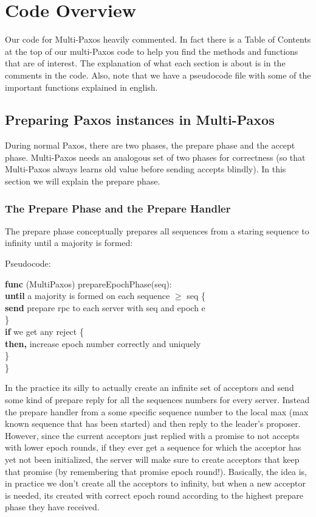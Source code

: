 \documentclass[a4paper]{article}
\begin{document}
\section{Code Overview}

Our code for Multi-Paxos heavily commented. In fact there is a Table of Contents at the top of our multi-Paxos code to help you find the methods and functions that are of interest.
The explanation of what each section is about is in the comments in the code.
Also, note that we have a pseudocode file with some of the important functions explained in english.

\subsection{Preparing Paxos instances in Multi-Paxos}

During normal Paxos, there are two phases, the prepare phase and the accept phase. 
Multi-Paxos needs an analogous set of two phases for correctness (so that Multi-Paxos always learns old value before sending accepts blindly). 
In this section we will explain the prepare phase.

\subsubsection{The Prepare Phase and the Prepare Handler}

The prepare phase conceptually prepares all sequences from a staring sequence to infinity until a majority is formed:

Pseudocode:

\textbf{func} (MultiPaxos) prepareEpochPhase(seq):\\
\indent \indent \textbf{until} a majority is formed on each sequence $\geq$ seq \{ \\
\indent \indent \indent \textbf{send} prepare rpc to each server with seq and epoch e \\
\indent \indent  \} \\
\indent \indent \textbf{if} we get any reject \{ \\
\indent \indent \indent \textbf{then,} increase epoch number correctly and uniquely \\
\indent \indent \} \\
\indent \}

In the practice its silly to actually create an infinite set of acceptors and send some kind of prepare reply for all the sequences numbers for every server.
Instead the prepare handler from a some specific sequence number to the local max (max known sequence that has been started) and then reply to the leader's proposer.
However, since the current acceptors just replied with a promise to not accepts with lower epoch rounds, if they ever get a sequence for which the acceptor has yet not been initialized, the server will make sure to create acceptors that keep that promise (by remembering that promise epoch round!).
Basically, the idea is, in practice we don't create all the acceptors to infinity, but when a new acceptor is needed, its created with correct epoch round according to the highest prepare phase they have received.
\end{document}
